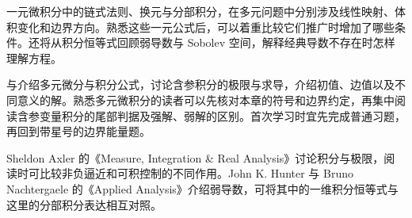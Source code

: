 \ProseParagraphBreak

一元微积分中的链式法则、换元与分部积分，在多元问题中分别涉及线性映射、体积变化和边界方向。熟悉这些一元公式后，可以着重比较它们推广时增加了哪些条件。还将从积分恒等式回顾弱导数与 Sobolev 空间，解释经典导数不存在时怎样理解方程。

\ProseParagraphBreak

与介绍多元微分与积分公式，讨论含参积分的极限与求导，介绍初值、边值以及不同意义的解。熟悉多元微积分的读者可以先核对本章的符号和边界约定，再集中阅读含参变量积分的尾部判据及强解、弱解的区别。首次学习时宜先完成普通习题，再回到带星号的边界能量题。

\ProseParagraphBreak

Sheldon Axler 的《Measure, Integration \& Real Analysis》\cite[Chapter 3]{Axler2020Measure}讨论积分与极限，阅读时可比较非负逼近和可积控制的不同作用。John K. Hunter 与 Bruno Nachtergaele 的《Applied Analysis》\cite[Section 12.9]{Hunter2001Applied}介绍弱导数，可将其中的一维积分恒等式与这里的分部积分表达相互对照。


